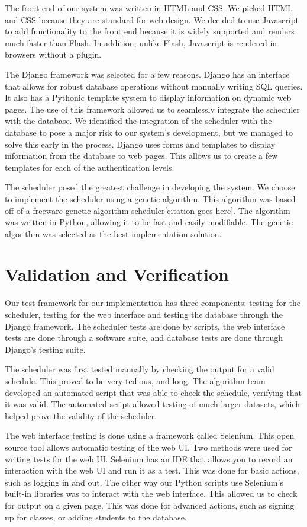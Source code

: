 \documentclass[12pt]{article}
\begin{document}
The front end of our system was written in HTML and CSS. We picked HTML and CSS because they are standard for web design. We decided to use Javascript to add functionality to the front end because it is widely supported and renders much faster than Flash. In addition, unlike Flash, Javascript is rendered in browsers without a plugin.

The Django framework was selected for a few reasons. Django has an interface that allows for robust database operations without manually writing SQL queries. It also has a Pythonic template system to display information on dynamic web pages. The use of this framework allowed us to seamlessly integrate the scheduler with the database. We identified the integration of the scheduler with the database to pose a major risk to our system's development, but we managed to solve this early in the process. Django uses forms and templates to display information from the database to web pages. This allows us to create a few templates for each of the authentication levels. %

The scheduler posed the greatest challenge in developing the system. We choose to implement the scheduler using a genetic algorithm. This algorithm was based off of a freeware genetic algorithm scheduler[citation goes here]. The algorithm was written in Python, allowing it to be fast and easily modifiable. The genetic algorithm was selected as the best implementation solution.

\section{Validation and Verification} %
Our test framework for our implementation has three components: testing for the scheduler, testing for the web interface and testing the database through the Django framework. The scheduler tests are done by scripts, the web interface tests are done through a software suite, and database tests are done through Django's testing suite.

The scheduler was first tested manually by checking the output for a valid schedule. This proved to be very tedious, and long. The algorithm team developed an automated script that was able to check the schedule, verifying that it was valid. The automated script allowed testing of much larger datasets, which helped prove the validity of the scheduler.

The web interface testing is done using a framework called Selenium. This open source tool allows automatic testing of the web UI. Two methods were used for writing tests for the web UI. Selenium has an IDE that allows you to record an interaction with the web UI and run it as a test. This was done for basic actions, such as logging in and out. The other way our Python scripts use Selenium's built-in libraries was to interact with the web interface. This allowed us to check for output on a given page. This was done for advanced actions, such as signing up for classes, or adding students to the database.
\end{document}
